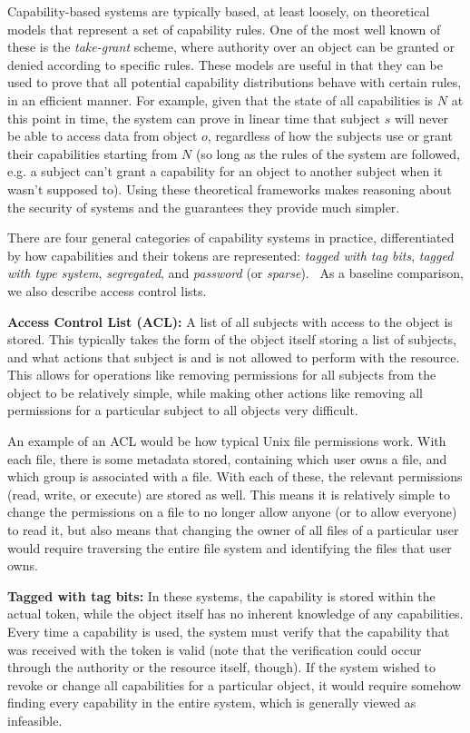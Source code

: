 Capability-based systems are typically based, at least loosely, on theoretical models that represent a set of capability rules. One of the most well known of these is the {\em take-grant} scheme, where authority over an object can be granted or denied according to specific rules.\cite{lipton1977} These models are useful in that they can be used to prove that all potential capability distributions behave with certain rules, in an efficient manner. For example, given that the state of all capabilities is $N$ at this point in time, the system can prove in linear time that subject $s$ will never be able to access data from object $o$, regardless of how the subjects use or grant their capabilities starting from $N$ (so long as the rules of the system are followed, e.g. a subject can't grant a capability for an object to another subject when it wasn't supposed to). Using these theoretical frameworks makes reasoning about the security of systems and the guarantees they provide much simpler.

There are four general categories of capability systems in practice, differentiated by how capabilities and their tokens are represented: {\em tagged with tag bits}, {\em tagged with type system}, {\em segregated}, and {\em password} (or {\em sparse}).~\cite{nevillmasters} As a baseline comparison, we also describe access control lists.

{\bf Access Control List (ACL):} A list of all subjects with access to the object is stored. This typically takes the form of the object itself storing a list of subjects, and what actions that subject is and is not allowed to perform with the resource. This allows for operations like removing permissions for all subjects from the object to be relatively simple, while making other actions like removing all permissions for a particular subject to all objects very difficult.

An example of an ACL would be how typical Unix file permissions work. With each file, there is some metadata stored, containing which user owns a file, and which group is associated with a file. With each of these, the relevant permissions (read, write, or execute) are stored as well. This means it is relatively simple to change the permissions on a file to no longer allow anyone (or to allow everyone) to read it, but also means that changing the owner of all files of a particular user would require traversing the entire file system and identifying the files that user owns. 

{\bf Tagged with tag bits:} In these systems, the capability is stored within the actual token, while the object itself has no inherent knowledge of any capabilities. Every time a capability is used, the system must verify that the capability that was received with the token is valid (note that the verification could occur through the authority or the resource itself, though). If the system wished to revoke or change all capabilities for a particular object, it would require somehow finding every capability in the entire system, which is generally viewed as infeasible. 

